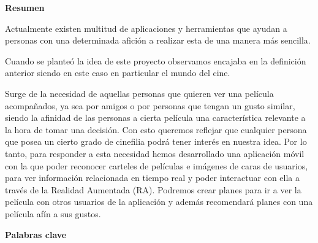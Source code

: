 
\newpage

\thispagestyle{empty}

\begin{center}

{\bf \Huge Resumen}

  \end{center}
\vspace{1cm}
\begin{flushleft}
  Actualmente existen multitud de aplicaciones y herramientas que ayudan a personas con una determinada 
  afición a realizar esta de una manera más sencilla.
  \end{flushleft}
  \begin{flushleft}
  Cuando se planteó la idea de este proyecto observamos encajaba en la definición anterior siendo en este 
  caso en particular el mundo del cine. 
  \end{flushleft}
  \begin{flushleft}
  Surge de la necesidad de aquellas personas que quieren ver una película acompañados, ya sea por amigos o 
  por personas que tengan un gusto similar, siendo la afinidad de las personas a cierta película una característica 
  relevante a la hora de tomar una decisión. Con esto queremos reflejar que cualquier persona que posea un cierto grado 
  de cinefilia podrá tener interés en nuestra idea. Por lo tanto, para responder a esta necesidad hemos desarrollado una 
  aplicación móvil con la que poder reconocer carteles de películas e imágenes de caras de usuarios, para ver información 
  relacionada en tiempo real y poder interactuar con ella a través de la Realidad Aumentada (RA). Podremos crear planes 
  para ir a ver la película con otros usuarios de la aplicación y además recomendará planes con una película afín a sus gustos.
  \end{flushleft}

\vspace{1cm}


\begin{center}

{\bf \Large Palabras clave}

   \end{center}


